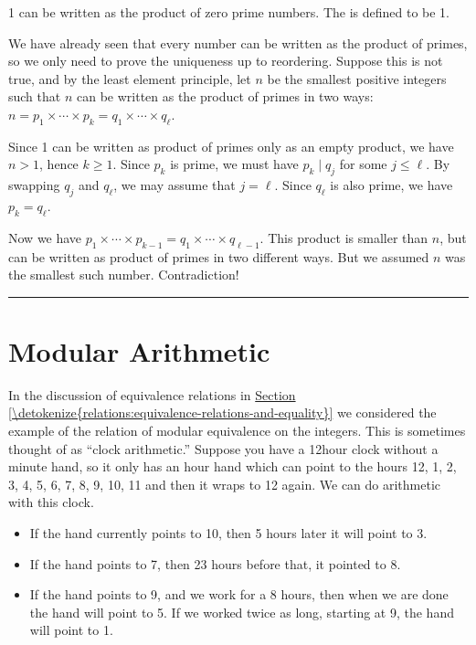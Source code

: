\documentclass[letterpaper,10pt,english]{sphinxmanual}
\begin{document}
\sphinxAtStartPar
{} 1 can be written as the product of zero prime numbers. The  is defined to be 1.

\sphinxAtStartPar
{} We have already seen that every number can be written as the product of primes, so we only need to prove the uniqueness up to reordering. Suppose this is not true, and by the least element principle, let \(n\) be the smallest positive integers such that \(n\) can be written as the product of primes in two ways: \(n = p_1\times \cdots \times p_k = q_1 \times \cdots \times q_\ell\).

\sphinxAtStartPar
Since 1 can be written as product of primes only as an empty product, we have \(n > 1\), hence \(k \geq 1\). Since \(p_k\) is prime, we must have \(p_k \mid q_j\) for some \(j \leq \ell\). By swapping \(q_j\) and \(q_\ell\), we may assume that \(j = \ell\). Since \(q_\ell\) is also prime, we have \(p_k = q_\ell\).

\sphinxAtStartPar
Now we have \(p_1\times \cdots \times p_{k-1} = q_1 \times \cdots \times q_{\ell-1}\). This product is smaller than \(n\), but can be written as product of primes in two different ways. But we assumed \(n\) was the smallest such number. Contradiction!


\bigskip\hrule\bigskip



\section{Modular Arithmetic}
\label{\detokenize{elementary_number_theory:modular-arithmetic}}\label{\detokenize{elementary_number_theory:id2}}
\sphinxAtStartPar
In the discussion of equivalence relations in \hyperref[\detokenize{relations:equivalence-relations-and-equality}]{Section \ref{\detokenize{relations:equivalence-relations-and-equality}}} we considered the example of the relation of modular equivalence on the integers. This is sometimes thought of as “clock arithmetic.” Suppose you have a 12\sphinxhyphen{}hour clock without a minute hand, so it only has an hour hand which can point to the hours 12, 1, 2, 3, 4, 5, 6, 7, 8, 9, 10, 11 and then it wraps to 12 again. We can do arithmetic with this clock.
\begin{itemize}
\item {} 
\sphinxAtStartPar
If the hand currently points to 10, then 5 hours later it will point to 3.

\item {} 
\sphinxAtStartPar
If the hand points to 7, then 23 hours before that, it pointed to 8.

\item {} 
\sphinxAtStartPar
If the hand points to 9, and we work for a 8 hours, then when we are done the hand will point to 5. If we worked twice as long, starting at 9, the hand will point to 1.

\end{itemize}
\end{document}
